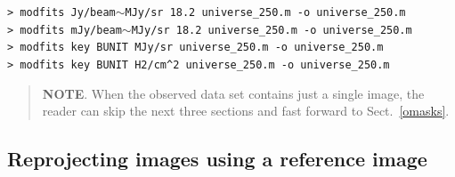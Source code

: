 \documentclass[a4paper,10pt]{article}
\begin{document}
{\small\verb!> modfits Jy/beam!$\sim$\verb!MJy/sr 18.2 universe_250.m -o universe_250.m!}\\
{\small\verb!> modfits mJy/beam!$\sim$\verb!MJy/sr 18.2 universe_250.m -o universe_250.m!}\\
{\small\verb!> modfits key BUNIT MJy/sr universe_250.m -o universe_250.m!}\\
{\small\verb!> modfits key BUNIT H2/cm^2 universe_250.m -o universe_250.m!}
\begin{quote} %
\textbf{NOTE}. When the observed data set contains just a single image, the reader can skip the next three sections and fast
forward to Sect.~\ref{omasks}.
\end{quote} %


\subsection{Reprojecting images using a reference image}
\label{refimage}
\end{document}
